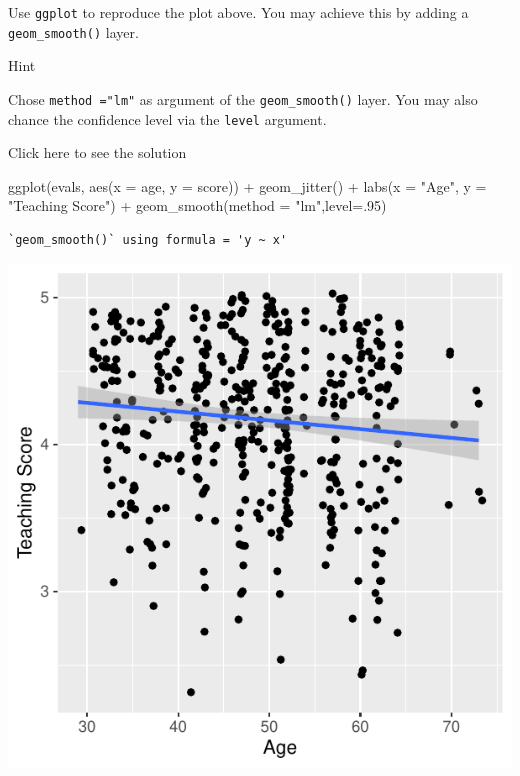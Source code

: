 \documentclass[
  letterpaper,
  DIV=11,
  numbers=noendperiod]{scrartcl}
\newenvironment{Shaded}{\begin{snugshade}}{\end{snugshade}}
\newcommand{\AttributeTok}[1]{\textcolor[rgb]{0.40,0.45,0.13}{#1}}
\newcommand{\DecValTok}[1]{\textcolor[rgb]{0.68,0.00,0.00}{#1}}
\newcommand{\FunctionTok}[1]{\textcolor[rgb]{0.28,0.35,0.67}{#1}}
\newcommand{\NormalTok}[1]{\textcolor[rgb]{0.00,0.23,0.31}{#1}}
\newcommand{\SpecialCharTok}[1]{\textcolor[rgb]{0.37,0.37,0.37}{#1}}
\newcommand{\StringTok}[1]{\textcolor[rgb]{0.13,0.47,0.30}{#1}}
\begin{document}
\begin{tcolorbox}[enhanced jigsaw, colback=white, toptitle=1mm, bottomrule=.15mm, colbacktitle=quarto-callout-warning-color!10!white, breakable, title={Task 3}, colframe=quarto-callout-warning-color-frame, opacitybacktitle=0.6, toprule=.15mm, arc=.35mm, coltitle=black, leftrule=.75mm, bottomtitle=1mm, titlerule=0mm, opacityback=0, rightrule=.15mm, left=2mm]

Use \texttt{ggplot} to reproduce the plot above. You may achieve this by
adding a \texttt{geom\_smooth()} layer.

Hint

Chose \texttt{method\ ="lm"} as argument of the \texttt{geom\_smooth()}
layer. You may also chance the confidence level via the \texttt{level}
argument.

Click here to see the solution

\begin{Shaded}
\begin{Highlighting}[]
\FunctionTok{ggplot}\NormalTok{(evals, }\FunctionTok{aes}\NormalTok{(}\AttributeTok{x =}\NormalTok{ age, }\AttributeTok{y =}\NormalTok{ score)) }\SpecialCharTok{+}
  \FunctionTok{geom\_jitter}\NormalTok{() }\SpecialCharTok{+}
  \FunctionTok{labs}\NormalTok{(}\AttributeTok{x =} \StringTok{"Age"}\NormalTok{, }\AttributeTok{y =} \StringTok{"Teaching Score"}\NormalTok{) }\SpecialCharTok{+}
 \FunctionTok{geom\_smooth}\NormalTok{(}\AttributeTok{method =} \StringTok{"lm"}\NormalTok{,}\AttributeTok{level=}\NormalTok{.}\DecValTok{95}\NormalTok{)}
\end{Highlighting}
\end{Shaded}

\begin{verbatim}
`geom_smooth()` using formula = 'y ~ x'
\end{verbatim}

\begin{center}
\includegraphics{notes_files/figure-pdf/unnamed-chunk-22-1.pdf}
\end{center}


\end{tcolorbox}
\end{document}
